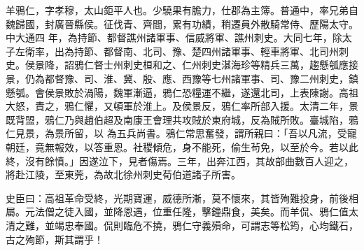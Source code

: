 \begin{pinyinscope}
 羊鴉仁，字孝穆，太山鉅平人也。少驍果有膽力，仕郡為主簿。普通中，率兄弟自魏歸國，封廣晉縣侯。征伐青、齊間，累有功績，稍遷員外散騎常侍、歷陽太守。中大通四
 年，為持節、都督譙州諸軍事、信威將軍、譙州刺史。大同七年，除太子左衛率，出為持節、都督南、北司、豫、楚四州諸軍事、輕車將軍、北司州刺史。侯景降，詔鴉仁督士州刺史桓和之、仁州刺史湛海珍等精兵三萬，趨懸瓠應接景，仍為都督豫、司、淮、冀、殷、應、西豫等七州諸軍事、司、豫二州刺史，鎮懸瓠。會侯景敗於渦陽，魏軍漸逼，鴉仁恐糧運不繼，遂還北司，上表陳謝。高祖大怒，責之，鴉仁懼，又頓軍於淮上。及侯景反，鴉仁率所部入援。太清二年，景既背盟，鴉仁乃與趙伯超及南康王會理共攻賊於東府城，反為賊所敗。臺城陷，鴉仁見景，為景所留，以
 為五兵尚書。鴉仁常思奮發，謂所親曰：「吾以凡流，受寵朝廷，竟無報效，以答重恩。社稷傾危，身不能死，偷生茍免，以至於今。若以此終，沒有餘憤。」因遂泣下，見者傷焉。三年，出奔江西，其故部曲數百人迎之，將赴江陵，至東莞，為故北徐州刺史荀伯道諸子所害。



 史臣曰：高祖革命受終，光期寶運，威德所漸，莫不懷來，其皆殉難投身，前後相屬。元法僧之徒入國，並降恩遇，位重任隆，擊鐘鼎食，美矣。而羊侃、鴉仁值太清之難，並竭忠奉國。侃則臨危不撓，鴉仁守義殞命，可謂志等松筠，心均鐵石，古之殉節，斯其謂乎！



\end{pinyinscope}